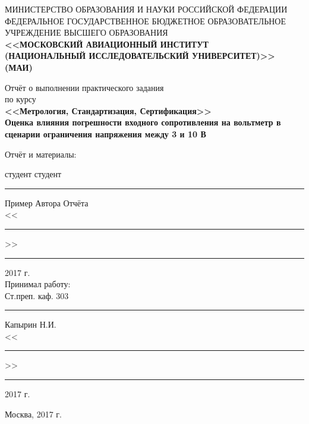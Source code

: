 \documentclass[12pt]{article}   %
\begin{document}
\thispagestyle{empty}
\begin{center}

{\scriptsize
МИНИСТЕРСТВО ОБРАЗОВАНИЯ И НАУКИ РОССИЙСКОЙ ФЕДЕРАЦИИ\\[.2cm]

ФЕДЕРАЛЬНОЕ ГОСУДАРСТВЕННОЕ БЮДЖЕТНОЕ ОБРАЗОВАТЕЛЬНОЕ\\[.2cm]

УЧРЕЖДЕНИЕ ВЫСШЕГО ОБРАЗОВАНИЯ\\[.2cm]

\textbf{<<МОСКОВСКИЙ АВИАЦИОННЫЙ ИНСТИТУТ}\\[.2cm]

\textbf{(НАЦИОНАЛЬНЫЙ ИССЛЕДОВАТЕЛЬСКИЙ УНИВЕРСИТЕТ)>> (МАИ)}\\[.2cm]
}

\vfill
{\large
Отчёт о выполнении практического задания\\
по курсу\\
\textbf{<<Метрология, Стандартизация, Сертификация>>}\\[0.4cm]
\bfseries Оценка влияния погрешности входного сопротивления на вольтметр в сценарии ограничения напряжения между 3 и 10 В\\[2cm]}

\vfill

\begin{minipage}[t]{0.3\textwidth}
	\begin{flushleft}
    Отчёт и материалы:\\\bigskip
    \end{flushleft}
\end{minipage}%
\begin{minipage}[t]{0.7\textwidth}
    \begin{flushright}
	студент студент\\[.4cm]
	\rule{4cm}{1pt} Пример Автора Отчёта\\
	<<\rule{.8cm}{1pt}>> \rule{3cm}{1pt} 2017 г.\\\bigskip
	Принимал работу:\\
	Ст.преп. каф. 303\\[.4cm]
	\rule{4cm}{1pt} Капырин Н.И.\\
	<<\rule{.8cm}{1pt}>> \rule{3cm}{1pt} 2017 г.
    \end{flushright}
\end{minipage}

\vfill

{\large Москва, 2017 г.}
\end{center}
\end{document}
